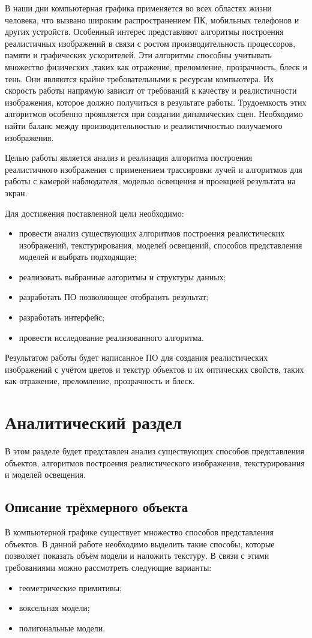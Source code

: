 \documentclass[12pt,a4paper,oneside]{report}
\begin{document}
		\quad В наши дни компьютерная графика применяется во всех областях жизни человека, что вызвано широким распространением ПК, мобильных телефонов и других устройств. Особенный интерес представляют алгоритмы построения реалистичных изображений в связи с ростом производительность процессоров, памяти и графических ускорителей. Эти алгоритмы способны учитывать множество физических ,таких как отражение, преломление, прозрачность, блеск и тень. Они являются крайне требовательными к ресурсам компьютера. Их скорость работы напрямую зависит от требований к качеству и реалистичности изображения, которое должно получиться в результате работы. Трудоемкость этих алгоритмов особенно проявляется при создании динамических сцен. Необходимо найти баланс между производительностью и реалистичностью получаемого изображения.
		
		\quad Целью работы является анализ и реализация алгоритма построения реалистичного изображения с применением трассировки лучей и алгоритмов для работы с камерой наблюдателя, моделью освещения и проекцией результата на экран.
		
		\quad Для достижения поставленной цели необходимо:
		\begin{itemize}
			\item провести анализ существующих алгоритмов построения реалистических изображений, текстурирования, моделей освещений, способов представления моделей и выбрать подходящие;
    		\item реализовать выбранные алгоритмы и структуры данных;
    		\item разработать ПО позволяющее отобразить результат;
    		\item разработать интерфейс;
    		\item провести исследование реализованного алгоритма.
    	\end{itemize}
    	\quad Результатом работы будет написанное ПО для создания реалистических изображений с учётом цветов и текстур объектов и их оптических свойств, таких как отражение, преломление, прозрачность и блеск.
    \chapter{Аналитический раздел}
    	\quad В этом разделе будет представлен анализ существующих способов представления объектов, алгоритмов построения реалистического изображения, текстурирования и моделей освещения.
    \section{Описание трёхмерного объекта}
    	\quad В компьютерной графике существует множество способов представления объектов. В данной работе необходимо выделить такие способы, которые позволяет показать объём модели и наложить текстуру. В связи с этими требованиями можно рассмотреть следующие варианты:
    	\begin{itemize}
			\item геометрические примитивы;
    		\item воксельная модели;
    		\item полигональные модели.
    	\end{itemize}
\end{document}
